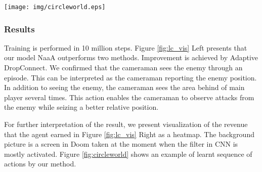 \begin{figure*}[t]
\centering
\texttt{[image: img/circleworld.eps]}
\caption{
NaaA leads the agents to obtain cooperative relationship.
First, the two agents are facing in different directions,
and the cameraman sells its information to the main player (\textbf{1}).
The main player who bought the information starts to turn right to find the enemy.
The cameraman who sold the information starts to turn left to seek new information by finding the blind area of the main player (\textbf{2} and \textbf{3}).
With turning, the main player attacks the first enemy which he already saw (\textbf{4} and \textbf{5}).
After the main player finds out the enemy, he attacks the enemy, and obtain the reward  (\textbf{6} and \textbf{7}).
Until the next enemy appears, the agents watch their dead area each other (\textbf{8}).
}
\label{fig:circleworld}
\end{figure*}

\subsubsection{Results}
Training is performed in 10 million steps.
Figure \ref{fig:lc_vis} Left presents that our model NaaA outperforms two methods.
Improvement is achieved by Adaptive DropConnect.
We confirmed that the cameraman sees the enemy through an episode.
This can be interpreted as the cameraman reporting the enemy position.
In addition to seeing the enemy, the cameraman sees the area behind of main player several times.
This action enables the cameraman to observe attacks from the enemy while seizing a better relative position.

For further interpretation of the result, 
we present visualization of the revenue that the agent earned in Figure \ref{fig:lc_vis} Right as a heatmap.
The background picture is a screen in Doom taken at the moment when the filter in CNN is mostly activated.
Figure \ref{fig:circleworld} shows an example of learnt sequence of actions by our method.

